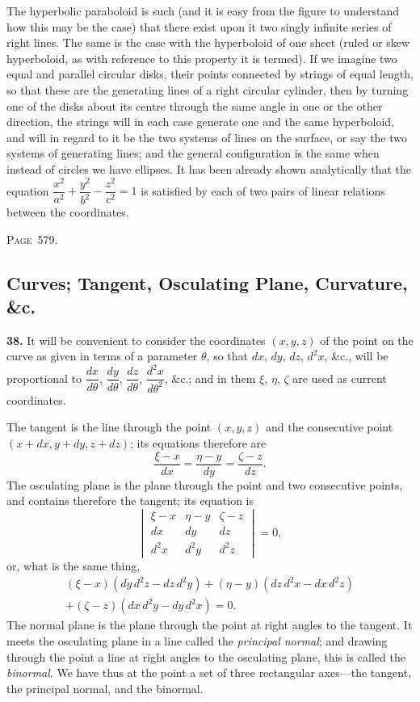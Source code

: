 \documentclass[11pt,a4paper]{book}
\begin{document}
The hyperbolic paraboloid is such (and it is easy from the figure to understand how this may be the case) that there exist upon it two singly infinite series of right lines. The same is the case with the hyperboloid of one sheet (ruled or skew hyperboloid, as with reference to this property it is termed). If we imagine two equal and parallel circular disks, their points connected by strings of equal length, so that these are the generating lines of a right circular cylinder, then by turning one of the disks about its centre through the same angle in one or the other direction, the strings will in each case generate one and the same hyperboloid, and will in regard to it be the two systems of lines on the surface, or say the two systems of generating lines; and the general configuration is the same when instead of circles we have ellipses. It has been already shown analytically that the equation $\dfrac{x^2}{a^2}+\dfrac{y^2}{b^2}-\dfrac{z^2}{c^2}=1$ is satisfied by each of two pairs of linear relations between the coordinates.

\newpage
\noindent\textsc{Page~579.} \subsection*{Curves; Tangent, Osculating Plane, Curvature, \&c.}

\textbf{38.} It will be convenient to consider the coordinates $(x,y,z)$ of the point on the curve as given in terms of a parameter $\theta$, so that $dx$, $dy$, $dz$, $d^2x$, \&c., will be proportional to $\dfrac{dx}{d\theta}$, $\dfrac{dy}{d\theta}$, $\dfrac{dz}{d\theta}$, $\dfrac{d^2x}{d\theta^2}$, \&c.; and in them $\xi$, $\eta$, $\zeta$ are used as current coordinates.

The tangent is the line through the point $(x,y,z)$ and the consecutive point $(x+dx, y+dy, z+dz)$; its equations therefore are
\[
\frac{\xi-x}{dx}=\frac{\eta-y}{dy}=\frac{\zeta-z}{dz}.
\]
The osculating plane is the plane through the point and two consecutive points, and contains therefore the tangent; its equation is
\[
\begin{vmatrix}
\xi-x & \eta-y & \zeta-z \\
dx & dy & dz \\
d^2x & d^2y & d^2z
\end{vmatrix}=0,
\]
or, what is the same thing,
\begin{multline}
(\xi-x)(dy\,d^2z-dz\,d^2y)+(\eta-y)(dz\,d^2x-dx\,d^2z)\\
+(\zeta-z)(dx\,d^2y-dy\,d^2x)=0.
\end{multline}
The normal plane is the plane through the point at right angles to the tangent. It meets the osculating plane in a line called the \textit{principal normal}; and drawing through the point a line at right angles to the osculating plane, this is called the \textit{binormal}. We have thus at the point a set of three rectangular axes---the tangent, the principal normal, and the binormal.
\end{document}

